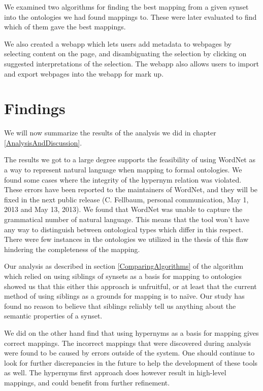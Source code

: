 We examined two algorithms for finding the best mapping from a given synset into the ontologies we had found mappings to.
These were later evaluated to find which of them gave the best mappings.

We also created a webapp which lets users add metadata to webpages by selecting content on the page,
and disambiguating the selection by clicking on suggested interpretations of the selection.
The webapp also allows users to import and export webpages into the webapp for mark up.

\section{Findings}
We will now summarize the results of the analysis we did in chapter \ref{AnalysisAndDiscussion}.

The results we got to a large degree supports the feasibility of using WordNet as a way to represent natural language
when mapping to formal ontologies.
We found some cases where the integrity of the hypernym relation was violated.
These errors have been reported to the maintainers of WordNet, and they will be fixed in the next public  release (C. Fellbaum, personal communication, May 1, 2013 and May 13, 2013).
We found that WordNet was unable to capture the grammatical number of natural language.
This means that the tool won't have any way to distinguish between ontological types which differ in this respect.
There were few instances in the ontologies we utilized in the thesis of this flaw hindering the completeness of the mapping.

Our analysis as described in section \ref{ComparingAlgorithms} of the algorithm which relied on
using siblings of synsets as a basis for mapping to ontologies showed us that this either this approach is unfruitful,
or at least that the current method of using siblings as a grounds for mapping is to naïve.
Our study has found no reason to believe that siblings reliably tell us anything about the semantic properties of a synset.

We did on the other hand find that using hypernyms as a basis for mapping gives correct mappings.
The incorrect mappings that were discovered during analysis were found to be caused by errors outside of the system.
One should continue to look for further discrepancies in the future to help the development of these tools as well.
The hypernyms first approach does however result in high-level mappings, and could benefit from further refinement.


